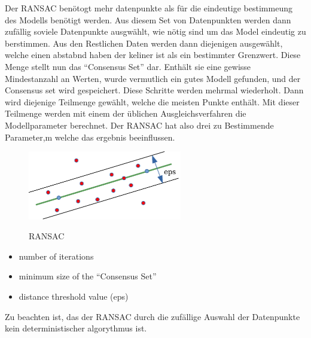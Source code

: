 Der \ac{RANSAC} benötogt mehr datenpunkte als für die eindeutige bestimmeung des Modells benötigt werden. Aus diesem Set von Datenpunkten werden dann zufällig soviele Datenpunkte ausgwählt, wie nötig sind um das Model eindeutig zu berstimmen.
Aus den Restlichen Daten werden dann diejenigen ausgewählt, welche einen abstabnd haben der keliner ist als ein bestimmter Grenzwert. Diese Menge stellt nun das ``Consensus Set'' dar.  Enthält sie eine gewisse Mindestanzahl an Werten, wurde vermutlich ein gutes Modell gefunden, und der Consensus set wird gespeichert.
Diese Schritte werden mehrmal wiederholt. Dann wird diejenige Teilmenge gewählt, welche die meisten Punkte enthält. Mit dieser Teilmenge werden mit einem der üblichen Ausgleichsverfahren die Modellparameter berechnet.
Der \ac{RANSAC} hat also drei zu Bestimmende Parameter,m welche das ergebnis beeinflussen.

\begin{figure}[!ht]
\begin{center}
\caption{\acs{RANSAC} \cite{Fischler1981}}
\includegraphics[width=0.6\textwidth]{bilder/ransac.pdf}
\label{ransac}
\end{center}
\end{figure}


\begin{itemize}
 \item number of iterations
 \item minimum size of the ``Consensus Set''
 \item distance threshold value (eps)
\end{itemize}

Zu beachten ist, das der \ac{RANSAC} durch die zufällige Auswahl der Datenpunkte kein deterministischer algorythmus ist.


